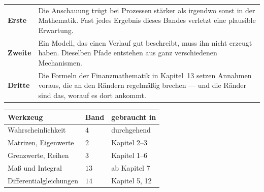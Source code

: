 \begin{warnung}
\begin{center}
{\small
\renewcommand{\arraystretch}{1.55}
\begin{tabular}{@{}P{2.2cm}P{6.4cm}@{}}
\toprule
\textbf{Erste} & Die Anschauung trügt bei Prozessen stärker als irgendwo sonst in der Mathematik. Fast jedes Ergebnis dieses Bandes verletzt eine plausible Erwartung.\\
\textbf{Zweite} & Ein Modell, das einen Verlauf gut beschreibt, muss ihn nicht erzeugt haben. Dieselben Pfade entstehen aus ganz verschiedenen Mechanismen.\\
\textbf{Dritte} & Die Formeln der Finanzmathematik in Kapitel~13 setzen Annahmen voraus, die an den Rändern regelmäßig brechen --- und die Ränder sind das, worauf es dort ankommt.\\
\bottomrule
\end{tabular}}
\end{center}

\begin{center}
\begin{minipage}{0.88\textwidth}
\end{minipage}
\end{center}
\end{warnung}

\begin{merksatz}
\begin{center}
{\small
\renewcommand{\arraystretch}{1.48}
\begin{tabular}{@{}P{3.4cm}P{1.4cm}P{2.8cm}@{}}
\toprule
\textbf{Werkzeug} & \textbf{Band} & \textbf{gebraucht in}\\
\midrule
Wahrscheinlichkeit & $4$ & durchgehend\\
Matrizen, Eigenwerte & $2$ & Kapitel 2--3\\
Grenzwerte, Reihen & $3$ & Kapitel 1--6\\
Maß und Integral & $13$ & ab Kapitel 7\\
Differential\-gleichungen & $14$ & Kapitel 5, 12\\
\bottomrule
\end{tabular}}
\end{center}
\end{merksatz}
